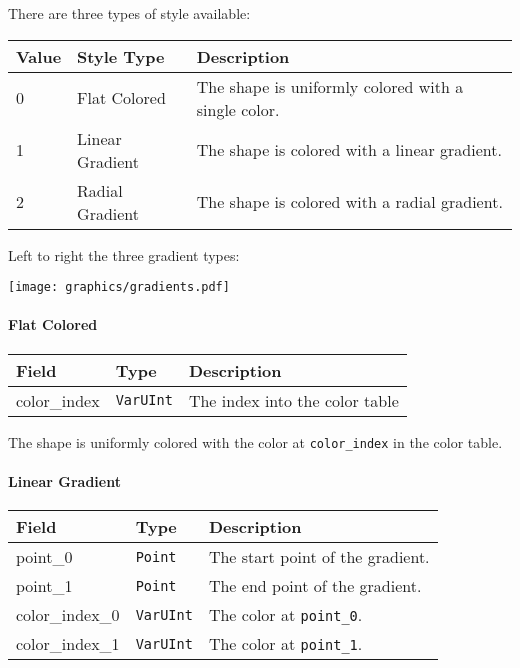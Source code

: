 \documentclass[]{article}
\begin{document}
There are three types of style available:

\begin{longtable}[]{@{}p{0.5in}p{1in}p{4.5in}@{}}
\toprule
Value & Style Type & Description \\
\midrule
\endhead
0 & Flat Colored & The shape is uniformly colored with a single
color. \\
1 & Linear Gradient & The shape is colored with a linear gradient. \\
2 & Radial Gradient & The shape is colored with a radial gradient. \\
\bottomrule
\end{longtable}

Left to right the three gradient types:

\begin{center}
\texttt{[image: graphics/gradients.pdf]}
\end{center}

\hypertarget{flat-colored}{\paragraph{Flat Colored}\label{flat-colored}}

\begin{longtable}[]{@{}p{1in}p{1in}p{4in}@{}}
\toprule
Field & Type & Description \\
\midrule
\endhead
color\_index & \texttt{VarUInt} & The index into the color table \\
\bottomrule
\end{longtable}

The shape is uniformly colored with the color at \texttt{color\_index}
in the color table.

\hypertarget{linear-gradient}{\paragraph{Linear Gradient}\label{linear-gradient}}

\begin{longtable}[]{@{}p{1in}p{1in}p{4in}@{}}
\toprule
Field & Type & Description \\
\midrule
\endhead
point\_0 & \texttt{Point} & The start point of the gradient. \\
point\_1 & \texttt{Point} & The end point of the gradient. \\
color\_index\_0 & \texttt{VarUInt} & The color at \texttt{point\_0}. \\
color\_index\_1 & \texttt{VarUInt} & The color at \texttt{point\_1}. \\
\bottomrule
\end{longtable}
\end{document}
